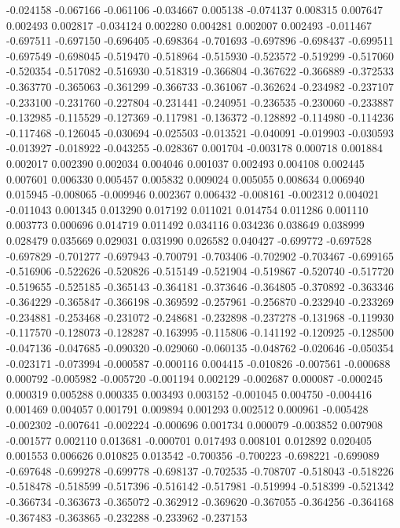 -0.024158
-0.067166
-0.061106
-0.034667
0.005138
-0.074137
0.008315
0.007647
0.002493
0.002817
-0.034124
0.002280
0.004281
0.002007
0.002493
-0.011467
-0.697511
-0.697150
-0.696405
-0.698364
-0.701693
-0.697896
-0.698437
-0.699511
-0.697549
-0.698045
-0.519470
-0.518964
-0.515930
-0.523572
-0.519299
-0.517060
-0.520354
-0.517082
-0.516930
-0.518319
-0.366804
-0.367622
-0.366889
-0.372533
-0.363770
-0.365063
-0.361299
-0.366733
-0.361067
-0.362624
-0.234982
-0.237107
-0.233100
-0.231760
-0.227804
-0.231441
-0.240951
-0.236535
-0.230060
-0.233887
-0.132985
-0.115529
-0.127369
-0.117981
-0.136372
-0.128892
-0.114980
-0.114236
-0.117468
-0.126045
-0.030694
-0.025503
-0.013521
-0.040091
-0.019903
-0.030593
-0.013927
-0.018922
-0.043255
-0.028367
0.001704
-0.003178
0.000718
0.001884
0.002017
0.002390
0.002034
0.004046
0.001037
0.002493
0.004108
0.002445
0.007601
0.006330
0.005457
0.005832
0.009024
0.005055
0.008634
0.006940
0.015945
-0.008065
-0.009946
0.002367
0.006432
-0.008161
-0.002312
0.004021
-0.011043
0.001345
0.013290
0.017192
0.011021
0.014754
0.011286
0.001110
0.003773
0.000696
0.014719
0.011492
0.034116
0.034236
0.038649
0.038999
0.028479
0.035669
0.029031
0.031990
0.026582
0.040427
-0.699772
-0.697528
-0.697829
-0.701277
-0.697943
-0.700791
-0.703406
-0.702902
-0.703467
-0.699165
-0.516906
-0.522626
-0.520826
-0.515149
-0.521904
-0.519867
-0.520740
-0.517720
-0.519655
-0.525185
-0.365143
-0.364181
-0.373646
-0.364805
-0.370892
-0.363346
-0.364229
-0.365847
-0.366198
-0.369592
-0.257961
-0.256870
-0.232940
-0.233269
-0.234881
-0.253468
-0.231072
-0.248681
-0.232898
-0.237278
-0.131968
-0.119930
-0.117570
-0.128073
-0.128287
-0.163995
-0.115806
-0.141192
-0.120925
-0.128500
-0.047136
-0.047685
-0.090320
-0.029060
-0.060135
-0.048762
-0.020646
-0.050354
-0.023171
-0.073994
-0.000587
-0.000116
0.004415
-0.010826
-0.007561
-0.000688
0.000792
-0.005982
-0.005720
-0.001194
0.002129
-0.002687
0.000087
-0.000245
0.000319
0.005288
0.000335
0.003493
0.003152
-0.001045
0.004750
-0.004416
0.001469
0.004057
0.001791
0.009894
0.001293
0.002512
0.000961
-0.005428
-0.002302
-0.007641
-0.002224
-0.000696
0.001734
0.000079
-0.003852
0.007908
-0.001577
0.002110
0.013681
-0.000701
0.017493
0.008101
0.012892
0.020405
0.001553
0.006626
0.010825
0.013542
-0.700356
-0.700223
-0.698221
-0.699089
-0.697648
-0.699278
-0.699778
-0.698137
-0.702535
-0.708707
-0.518043
-0.518226
-0.518478
-0.518599
-0.517396
-0.516142
-0.517981
-0.519994
-0.518399
-0.521342
-0.366734
-0.363673
-0.365072
-0.362912
-0.369620
-0.367055
-0.364256
-0.364168
-0.367483
-0.363865
-0.232288
-0.233962
-0.237153
